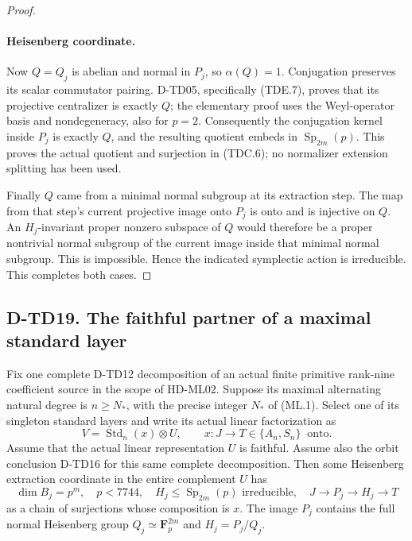 \begin{proof}
\paragraph{Heisenberg coordinate.}
Now $Q=Q_j$ is abelian and normal in $P_j$, so
$\alpha(Q)=1$. Conjugation preserves its scalar commutator
pairing. D-TD05, specifically (TDE.7), proves that its
projective centralizer is exactly $Q$; the elementary proof
uses the Weyl-operator basis and nondegeneracy, also for $p=2$.
Consequently the conjugation kernel inside $P_j$ is exactly
$Q$, and the resulting quotient embeds in
$\operatorname{Sp}_{2m}(p)$. This proves the actual quotient
and surjection in (TDC.6); no normalizer extension splitting
has been used.

Finally $Q$ came from a minimal normal subgroup at its extraction
step. The map from that step's current projective image onto
$P_j$ is onto and is injective on $Q$. An $H_j$-invariant
proper nonzero subspace of $Q$ would therefore be a proper
nontrivial normal subgroup of the current image inside that
minimal normal subgroup. This is impossible. Hence the indicated
symplectic action is irreducible. This completes both cases.
\end{proof}

\subsection*{D-TD19. The faithful partner of a maximal standard layer}

\begin{theorem}[D-TD19]
Fix one complete D-TD12 decomposition of an actual finite primitive
rank-nine coefficient source in the scope of HD-ML02. Suppose its
maximal alternating natural degree is $n\ge N_*$, with the precise
integer $N_*$ of (ML.1). Select one of its singleton standard
layers and write its actual linear factorization as
\[
 V=\operatorname{Std}_n(x)\otimes U,
 \qquad x:J\longrightarrow T\in\{A_n,S_n\}\ \text{ onto}.
 \tag{TDC.10}
\]
Assume that the actual linear representation $U$ is faithful.
Assume also the orbit conclusion D-TD16 for this same complete
decomposition. Then some Heisenberg extraction coordinate in
the entire complement $U$ has
\[
 \dim B_j=p^m,\quad p<7744,\quad
 H_j\le\operatorname{Sp}_{2m}(p)\text{ irreducible},\quad
 J\longrightarrow P_j\longrightarrow H_j
           \longrightarrow T
 \tag{TDC.11}
\]
as a chain of surjections whose composition is $x$.
The image $P_j$ contains the full normal Heisenberg group
$Q_j\simeq\mathbf F_p^{2m}$ and $H_j=P_j/Q_j$.
\end{theorem}

